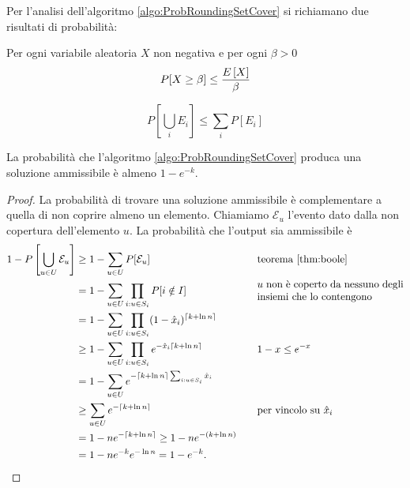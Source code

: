 Per l'analisi dell'algoritmo \ref{algo:ProbRoundingSetCover} si richiamano due risultati di probabilità:
\begin{theorem}\label{thm:markov}
	Per ogni variabile aleatoria $X$ non negativa e per ogni $\beta>0$
	\begin{equation*}
		P[X\geq\beta] \leq \frac{E\left[X\right]}{\beta}
	\end{equation*}
\end{theorem}
\begin{theorem}\label{thm:boole}
	\begin{equation*}
		P\left[\bigcup_i E_i\right] \leq \sum_i P[E_i]
	\end{equation*}
\end{theorem}

\begin{theorem}\label{thm:ammisetcover}
	La probabilità che l'algoritmo \ref{algo:ProbRoundingSetCover} produca una soluzione ammissibile è almeno $1-e^{-k}$.
\end{theorem}
\begin{proof}
	\newcommand{\eve}{\mathcal E}
	La probabilità di trovare una soluzione ammissibile è complementare a quella di non coprire almeno un elemento.
	Chiamiamo $\eve_u$ l'evento dato dalla non copertura dell'elemento $u$.
	La probabilità che l'output sia ammissibile è
	\begin{align*}
		1-P\left[\bigcup_{u\in U} \eve_u\right] & \geq 1-\sum_{u\in U} P[\eve_u]                                     &  & \quad \text{teorema \ref{thm:boole}}                                             \\
		                                        & = 1-\sum_{u\in U}\prod_{i:u\in S_i} P[i\notin I]                   &  & \quad \parbox{5cm}{$u$ non è coperto da nessuno degli insiemi che lo contengono} \\
		                                        & = 1-\sum_{u\in U}\prod_{i:u\in S_i} (1-\hat x_i)^{\ceil{k+\ln n}}                                                                                        \\
		                                        & \geq 1-\sum_{u\in U}\prod_{i:u\in S_i} e^{-\hat x_i\ceil{k+\ln n}} &  & \quad \text{$1-x\leq e^{-x}$}                                                    \\
		                                        & = 1-\sum_{u\in U} e^{-\ceil{k+\ln n}\sum_{i:u\in S_i} \hat x_i}                                                                                          \\
		                                        & \geq \sum_{u\in U} e^{-\ceil{k+\ln n}}                             &  & \quad \text{per vincolo su $\hat x_i$}                                           \\
		                                        & = 1-ne^{-\ceil{k+\ln n}} \geq 1-ne^{-(k+\ln n)}                                                                                                          \\
		                                        & = 1-ne^{-k}e^{-\ln n} = 1-e^{-k} \text.
	\end{align*}
\end{proof}

